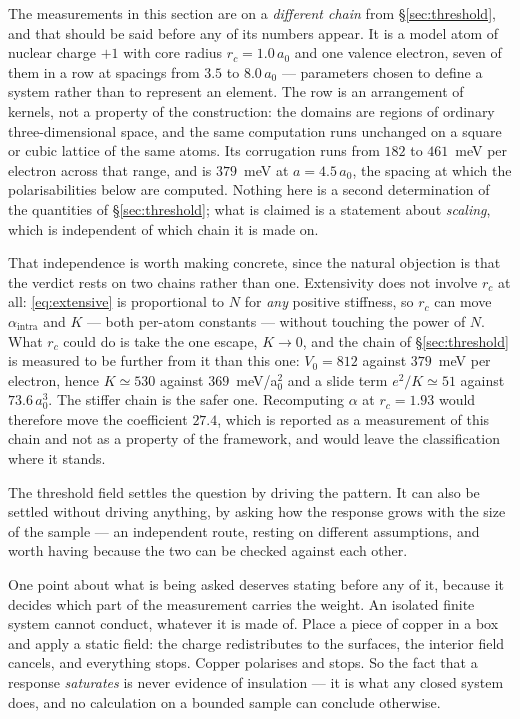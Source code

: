 \documentclass[11pt]{article}
\begin{document}
The measurements in this section are on a \emph{different chain} from \S\ref{sec:threshold}, and
that should be said before any of its numbers appear. It is a model atom of nuclear charge $+1$
with core radius $r_c=1.0\,a_0$ and one valence electron, seven of them in a row at spacings from
$3.5$ to $8.0\,a_0$ --- parameters chosen to define a system rather than to represent an element.
The row is an arrangement of kernels, not a property of the construction: the domains are regions of
ordinary three-dimensional space, and the same computation runs unchanged on a square or cubic
lattice of the same atoms. Its corrugation runs from
$182$ to $461$~meV per electron across that range, and is $379$~meV at $a=4.5\,a_0$, the spacing at
which the polarisabilities below are computed. Nothing here is a second determination of the
quantities of \S\ref{sec:threshold}; what is claimed is a statement about \emph{scaling}, which is
independent of which chain it is made on.

That independence is worth making concrete, since the natural objection is that the verdict rests on
two chains rather than one. Extensivity does not involve $r_c$ at all: \eqref{eq:extensive} is
proportional to $N$ for \emph{any} positive stiffness, so $r_c$ can move $\alpha_{\text{intra}}$ and
$K$ --- both per-atom constants --- without touching the power of $N$. What $r_c$ could do is take
the one escape, $K\to0$, and the chain of \S\ref{sec:threshold} is measured to be further from it
than this one: $V_0=812$ against $379$~meV per electron, hence $K\simeq530$ against
$369$~meV/a$_0^2$ and a slide term $e^2/K\simeq51$ against $73.6\,a_0^3$. The stiffer chain is the
safer one. Recomputing $\alpha$ at $r_c=1.93$ would therefore move the coefficient $27.4$, which is
reported as a measurement of this chain and not as a property of the framework, and would leave the
classification where it stands.

The threshold field settles the question by driving the pattern. It can also be settled without
driving anything, by asking how the response grows with the size of the sample --- an independent
route, resting on different assumptions, and worth having because the two can be checked against
each other.

One point about what is being asked deserves stating before any of it, because it decides which
part of the measurement carries the weight. An isolated finite system cannot conduct, whatever it is
made of. Place a piece of copper in a box and apply a static field: the charge redistributes to the
surfaces, the interior field cancels, and everything stops. Copper polarises and stops. So the fact
that a response \emph{saturates} is never evidence of insulation --- it is what any closed system
does, and no calculation on a bounded sample can conclude otherwise.
\end{document}
